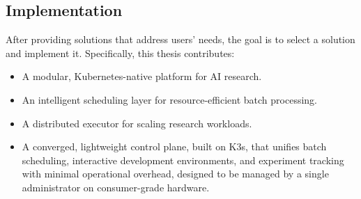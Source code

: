 \subsection{Implementation}

After providing solutions that address users' needs, the goal is to select a solution and implement it. Specifically, this thesis contributes:

\begin{itemize}
    \item A modular, Kubernetes-native platform for AI research.
    \item An intelligent scheduling layer for resource-efficient batch processing.
    \item A distributed executor for scaling research workloads.
    \item A converged, lightweight control plane, built on K3s, that unifies batch scheduling, interactive development environments, and experiment tracking with minimal operational overhead, designed to be managed by a single administrator on consumer-grade hardware.
\end{itemize}

